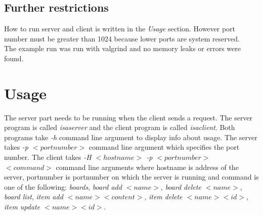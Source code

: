 \documentclass[11pt, a4paper]{article}
\begin{document}
	\subsection{Further restrictions}
	How to run server and client is written in the \textit{Usage} section. However port number must be greater than 1024 because lower ports are system reserved. \\
	The example run was run with valgrind and no memory leaks or errors were found.
		
	\newpage		
	\section{Usage}
	The server part needs to be running when the client sends a request. The server program is called \textit{isaserver} and the client program is called \textit{isaclient}. Both 		programs take \textit{-h} command line argument to display info about usage. The server takes \textit{-p $<portnumber>$} command line argument which specifies the port number. 	The client takes \textit{-H $<hostname>$ -p $<portnumber>$ $<command>$} command line arguments where hostname is address of the server, portnumber is portnumber on which the 		server is running and command is one of the following: \textit{boards}, \textit{board add $<name>$}, \textit{board delete $<name>$}, \textit{board list}, \textit{item add 		$<name> <content>$}, \textit{item delete $<name> <id>$}, \textit{item update $<name> <id>$}.
\end{document}

